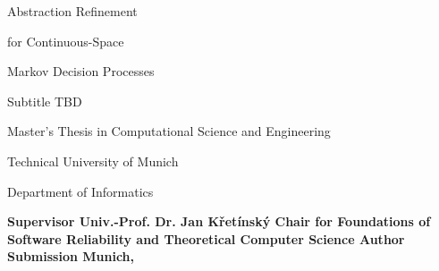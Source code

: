 \startalignment[flushright]
    \dontleavehmode
\stopalignment

\blank[15mm]

{ \CoverTitleFont
    \strut Abstraction Refinement \blank[3mm]
    \strut for Continuous-Space \blank[3mm]
    \strut Markov Decision Processes
}

\blank[7.5mm]

{\CoverSubtitleFont Subtitle TBD} %

\blank[100mm]

Master's Thesis in Computational Science and Engineering

Technical University of Munich

Department of Informatics

\blank[20mm]

\starttable[s0|lp(35mm)|lp(115mm)|]
    \NC \bf Supervisor \NC Univ.-Prof. Dr. Jan Křetínský \NC \AR
    \NC \NC Chair for Foundations of Software Reliability and 
    Theoretical Computer Science \NC \AR
    \SR
    \NC \bf Author \NC \Author \NC \AR
    \SR
    \NC \bf Submission \NC Munich, \DateOfCompletion \NC \AR
\stoptable


